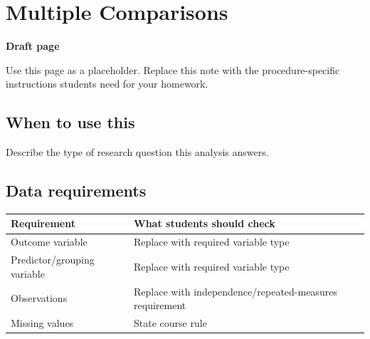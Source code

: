 \documentclass[
  letterpaper,
  DIV=11,
  numbers=noendperiod]{scrreprt}
\newcounter{none} %
\begin{document}
\chapter{Multiple Comparisons}\label{multiple-comparisons}

\begin{tcolorbox}[enhanced jigsaw, arc=.35mm, bottomrule=.15mm, breakable, colback=white, colframe=quarto-callout-note-color-frame, left=2mm, leftrule=.75mm, opacityback=0, rightrule=.15mm, toprule=.15mm]
\begin{minipage}[t]{5.5mm}
\textcolor{quarto-callout-note-color}{\faInfo}
\end{minipage}%
\begin{minipage}[t]{\textwidth - 5.5mm}

\vspace{-3mm}\textbf{Draft page}\vspace{3mm}

Use this page as a placeholder. Replace this note with the
procedure-specific instructions students need for your homework.

\end{minipage}%
\end{tcolorbox}

\section{When to use this}\label{when-to-use-this-7}

Describe the type of research question this analysis answers.

\section{Data requirements}\label{data-requirements-8}

{\def\LTcaptype{none} %
\begin{longtable}[]{@{}
  >{\raggedright\arraybackslash}p{}
  >{\raggedright\arraybackslash}p{}@{}}
\toprule\noalign{}
\begin{minipage}[b]{\linewidth}\raggedright
Requirement
\end{minipage} & \begin{minipage}[b]{\linewidth}\raggedright
What students should check
\end{minipage} \\
\midrule\noalign{}
\endhead
\bottomrule\noalign{}
\endlastfoot
Outcome variable & Replace with required variable type \\
Predictor/grouping variable & Replace with required variable type \\
Observations & Replace with independence/repeated-measures
requirement \\
Missing values & State course rule \\
\end{longtable}
}
\end{document}
